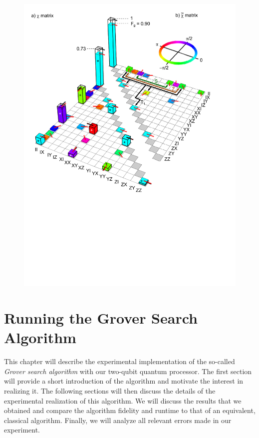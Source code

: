 \begin{figure}
	\centering
		\includegraphics[width=1.\textwidth]{./material/papers/iswap/figures/chi_matrix_and_error_process}
	\label{fig:GateChiMatrixAndErrorProcess}
	\caption{}
\end{figure}


\chapter{Running the Grover Search Algorithm}

This chapter will describe the experimental implementation of the so-called {\it Grover search algorithm} with our two-qubit quantum processor. The first section will provide a short introduction of the algorithm and motivate the interest in realizing it. The following sections will then discuss the details of the experimental realization of this algorithm. We will discuss the results that we obtained and compare the algorithm fidelity and runtime to that of an equivalent, classical algorithm. Finally, we will analyze all relevant errors made in our experiment.

